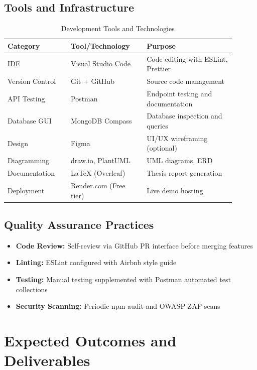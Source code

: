 \documentclass[12pt, a4paper]{report}
\begin{document}
\subsection{Tools and Infrastructure}

\begin{table}[H]
\centering
\caption{Development Tools and Technologies}
\label{tab:dev_tools}
\begin{tabular}{@{}p{0.25\linewidth}p{0.30\linewidth}p{0.35\linewidth}@{}}
\toprule
\textbf{Category} & \textbf{Tool/Technology} & \textbf{Purpose} \\
\midrule
IDE & Visual Studio Code & Code editing with ESLint, Prettier \\
Version Control & Git + GitHub & Source code management \\
API Testing & Postman & Endpoint testing and documentation \\
Database GUI & MongoDB Compass & Database inspection and queries \\
Design & Figma & UI/UX wireframing (optional) \\
Diagramming & draw.io, PlantUML & UML diagrams, ERD \\
Documentation & LaTeX (Overleaf) & Thesis report generation \\
Deployment & Render.com (Free tier) & Live demo hosting \\
\bottomrule
\end{tabular}
\end{table}

\subsection{Quality Assurance Practices}

\begin{itemize}
    \item \textbf{Code Review:} Self-review via GitHub PR interface before merging features
    \item \textbf{Linting:} ESLint configured with Airbnb style guide
    \item \textbf{Testing:} Manual testing supplemented with Postman automated test collections
    \item \textbf{Security Scanning:} Periodic npm audit and OWASP ZAP scans
\end{itemize}

\section{Expected Outcomes and Deliverables}
\end{document}
